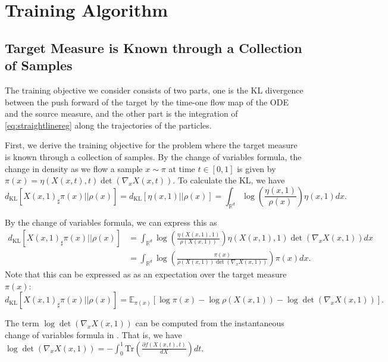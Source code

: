 \section{Training Algorithm} 
\subsection{Target Measure is Known through a Collection of Samples}
The training objective we consider consists of two parts, one is the KL divergence between the push forward of the target by the time-one flow map of the ODE and the source measure, and the other part is the integration of \ref{eq:straightlinereg} along the trajectories of the particles. 

First, we derive the training objective for the problem where the target measure is known through a collection of samples. By the change of variables formula, the change in density as we flow a sample $x\sim\pi$ at time $t\in[0,1]$ is given by $\pi(x) = \eta(X(x,t),t)\det(\nabla_x X(x,t))$. To calculate the KL, we have 
$$d_\text{KL}[X(x,1)_\sharp\pi(x)|| \rho(x)] = d_\text{KL}[\eta(x,1)|| \rho(x)] =\int_{\mathbb{R}^d} \log\left(\frac{\eta(x,1)}{\rho(x)}\right)\eta(x,1)dx.$$ 

By the change of variables formula, we can express this as
\begin{align*}
d_\text{KL}[X(x,1)_\sharp\pi(x)|| \rho(x)] 
&= \int_{\mathbb{R}^d} \log\left(\frac{\eta(X(x,1),1)}{\rho(X(x,1))}\right)\eta(X(x,1),1) \det(\nabla_x X(x,1))dx\\ 
&=  \int_{\mathbb{R}^d} \log\left(\frac{\pi(x)}{\rho(X(x,1))\det(\nabla_x X(x,1))}\right)\pi(x)dx.      
\end{align*}
Note that this can be expressed as as an expectation over the target measure $\pi(x)$: 
$$d_\text{KL}[X(x,1)_\sharp\pi(x)|| \rho(x)] = \mathbb{E}_{\pi(x)}[\log\pi(x) - \log\rho(X(x,1)) - \log\det(\nabla_x X(x,1))].$$

The term $\log\det(\nabla_x X(x,1))$ can be computed from the instantaneous change of variables formula in \cite{NeuralODE}. That is, we have $\log\det(\nabla_x X(x,1)) = -\int_0^1\text{Tr}\left(\frac{\partial f(X(x,t),t)}{dX}\right)dt$. 

